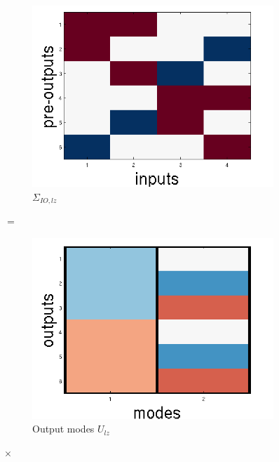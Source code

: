 \documentclass[10pt,letterpaper]{article}
\begin{document}
\begin{figure}
\centering
\begin{subfigure}{0.22\textwidth}
\includegraphics[width=\textwidth]{figures/linearized_IO.png}
\caption{$\Sigma_{IO,lz}$}
\end{subfigure}
\huge{$=$}
\begin{subfigure}{0.22\textwidth}
\includegraphics[width=\textwidth]{figures/U_lz.png}
\caption{Output modes $U_{lz}$}
\end{subfigure}
\LARGE{$\times$}
\begin{subfigure}{0.22\textwidth}

\end{subfigure}
\end{figure}
\end{document}

